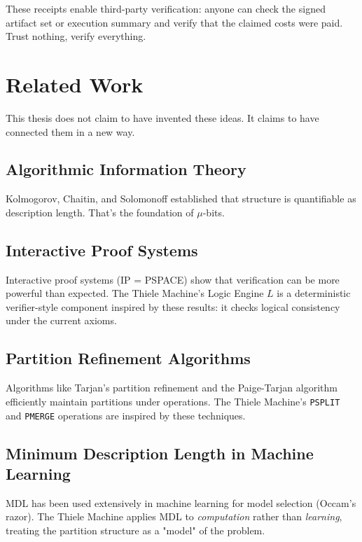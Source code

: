 These receipts enable third-party verification: anyone can check the signed artifact set or execution summary and verify that the claimed costs were paid. Trust nothing, verify everything.

\section{Related Work}

This thesis does not claim to have invented these ideas. It claims to have connected them in a new way.

\subsection{Algorithmic Information Theory}

Kolmogorov, Chaitin, and Solomonoff established that structure is quantifiable as description length. That's the foundation of $\mu$-bits.

\subsection{Interactive Proof Systems}

Interactive proof systems (IP = PSPACE) show that verification can be more powerful than expected. The Thiele Machine's Logic Engine $L$ is a deterministic verifier-style component inspired by these results: it checks logical consistency under the current axioms.

\subsection{Partition Refinement Algorithms}

Algorithms like Tarjan's partition refinement and the Paige-Tarjan algorithm efficiently maintain partitions under operations. The Thiele Machine's \texttt{PSPLIT} and \texttt{PMERGE} operations are inspired by these techniques.

\subsection{Minimum Description Length in Machine Learning}

MDL has been used extensively in machine learning for model selection (Occam's razor). The Thiele Machine applies MDL to \textit{computation} rather than \textit{learning}, treating the partition structure as a "model" of the problem.


